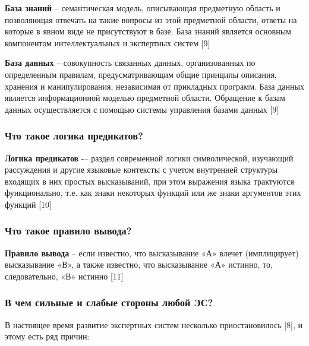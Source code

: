 \documentclass[14pt,a4paper,report]{report}
\begin{document}
\textbf{База знаний} -- семантическая модель, описывающая предметную область и позволяющая отвечать на такие вопросы из этой предметной области, ответы на которые в явном виде не присутствуют в базе. База знаний является основным компонентом интеллектуальных и экспертных систем [9]

\textbf{База данных} -- совокупность связанных данных, организованных по определенным правилам, предусматривающим общие принципы описания, хранения и манипулирования, независимая от прикладных программ. База данных является информационной моделью предметной области. Обращение к базам данных осуществляется с помощью системы управления базами данных [9]

\subsubsection{Что такое логика предикатов?}

\textbf{Логика предикатов} -– раздел современной логики символической, изучающий рассуждения и другие языковые контексты с учетом внутренней структуры входящих в них простых высказываний, при этом выражения языка трактуются функционально, т.е. как знаки некоторых функций или же знаки аргументов этих функций [10]

\subsubsection{Что такое правило вывода?}

\textbf{Правило вывода} -- если известно, что высказывание «А» влечет (имплицирует) высказывание «В», а также известно, что высказывание «А» истинно, то, следовательно, «В» истинно [11]

\subsubsection{В чем сильные и слабые стороны любой ЭС?}

В настоящее время развитие экспертных систем несколько приостановилось [8], и этому есть ряд причин:
\end{document}
